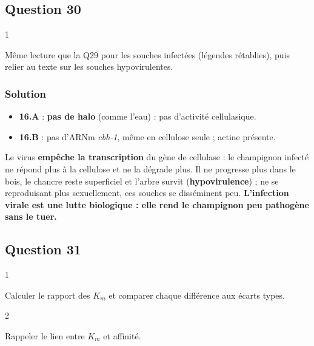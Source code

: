 \documentclass[11pt,a4paper]{article}
\providecommand{\tightlist}{\setlength{\itemsep}{0pt}\setlength{\parskip}{0pt}}
\begin{document}
\hypertarget{question-30}{%
\subsection{Question 30}\label{question-30}}

\begin{indication}{1}

Même lecture que la Q29 pour les souches infectées (légendes rétablies), puis relier au texte sur les souches hypovirulentes.

\end{indication}

\hypertarget{solution-30}{%
\subsubsection{Solution}\label{solution-30}}

\begin{itemize}
\tightlist
\item
  \textbf{16.A} : \textbf{pas de halo} (comme l'eau) : pas d'activité cellulasique.
\item
  \textbf{16.B} : pas d'ARNm \emph{cbh-1}, même en cellulose seule ; actine présente.
\end{itemize}

Le virus \textbf{empêche la transcription} du gène de cellulase : le champignon infecté ne répond plus à la cellulose et ne la dégrade plus. Il ne progresse plus dans le bois, le chancre reste superficiel et l'arbre survit (\textbf{hypovirulence}) ; ne se reproduisant plus sexuellement, ces souches se disséminent peu. \textbf{L'infection virale est une lutte biologique : elle rend le champignon peu pathogène sans le tuer.}

\hypertarget{question-31}{%
\subsection{Question 31}\label{question-31}}

\begin{indication}{1}

Calculer le rapport des \(K_m\) et comparer chaque différence aux écarts types.

\end{indication}

\begin{indication}{2}

Rappeler le lien entre \(K_m\) et affinité.

\end{indication}
\end{document}
